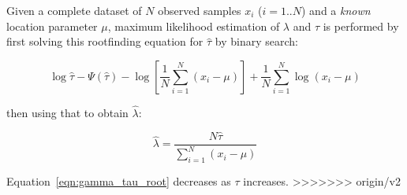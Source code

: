 Given a complete dataset of $N$ observed samples $x_i$ ($i=1..N$) and
a \emph{known} location parameter $\mu$, maximum likelihood estimation
of $\lambda$ and $\tau$ is performed by first solving this rootfinding
equation for $\hat{\tau}$ by binary search:

\begin{equation}
  \log \hat{\tau} 
  - \Psi(\hat{\tau}) 
  - \log \left[ \frac{1}{N} \sum_{i=1}^{N} (x_i - \mu) \right]
  + \frac{1}{N} \sum_{i=1}^N \log (x_i - \mu)
\label{eqn:gamma_tau_root}
\end{equation}

then using that to obtain $\hat{\lambda}$:

\begin{equation}
\hat{\lambda} = \frac{N \hat{\tau}} {\sum_{i=1}^{N} (x_i - \mu)}
\end{equation}

Equation~\ref{eqn:gamma_tau_root} decreases as $\tau$ increases.
>>>>>>> origin/v2
